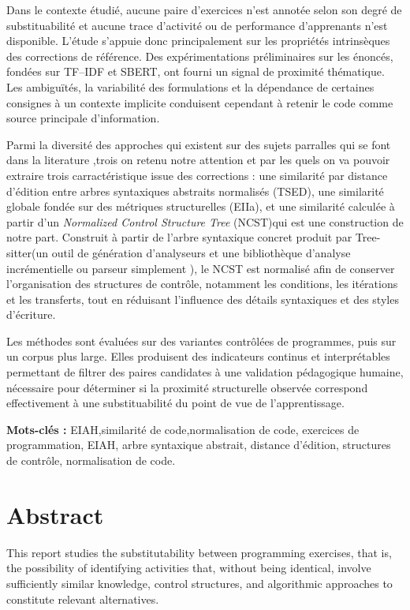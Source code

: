 \documentclass[12pt,a4paper,oneside]{report}
\begin{document}
Dans le contexte étudié, aucune paire d'exercices n'est annotée selon son
degré de substituabilité et aucune trace d'activité ou de performance
d'apprenants n'est disponible. L'étude s'appuie donc principalement sur
les propriétés intrinsèques des corrections de référence. Des
expérimentations préliminaires sur les énoncés, fondées sur TF--IDF et
SBERT, ont fourni un signal de proximité thématique. Les ambiguïtés, la
variabilité des formulations et la dépendance de certaines consignes à un
contexte implicite conduisent cependant à retenir le code comme source
principale d'information.

Parmi la diversité des approches qui existent sur des sujets parralles qui se font dans la literature
,trois on retenu notre attention 
et par les quels on va pouvoir extraire trois carractéristique issue  des corrections : une
similarité par distance d'édition entre arbres syntaxiques abstraits
normalisés (TSED), une similarité globale fondée sur des métriques
structurelles (EIIa), et une similarité calculée à partir d'un
\emph{Normalized Control Structure Tree} (NCST)qui est une construction de notre part. Construit à partir de
l'arbre syntaxique concret produit par Tree-sitter(un outil de génération d'analyseurs et une bibliothèque d'analyse incrémentielle ou  parseur simplement  ), le NCST est normalisé
afin de conserver l'organisation des structures de contrôle, notamment les
conditions, les itérations et les transferts, tout en réduisant
l'influence des détails syntaxiques et des styles d'écriture.

Les méthodes sont évaluées sur des variantes contrôlées de programmes,
puis sur un corpus plus large. Elles produisent des indicateurs continus et
interprétables permettant de filtrer des paires candidates à une validation
pédagogique humaine, nécessaire pour déterminer si la proximité structurelle
observée correspond effectivement à une substituabilité du point de vue de
l'apprentissage.

\vspace{2\baselineskip}
\textbf{Mots-clés :} EIAH,similarité de code,normalisation de code, exercices de programmation,
 EIAH, arbre syntaxique abstrait, distance d'édition, structures de contrôle, normalisation de code.

\chapter*{Abstract}
This report studies the substitutability between programming exercises, that is, the
 possibility of identifying activities that, without being identical, involve sufficiently similar
  knowledge, control structures, and algorithmic approaches to constitute relevant alternatives.
\end{document}
